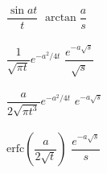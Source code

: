 \documentclass[nobib]{tufte-handout}
\begin{document}
\begin{center}
\begin{table}
\begin{tabbing}
            $\dfrac{\sin at}{t}$	\> $\arctan \dfrac{a}{s}$ \>\LTNUM \\ \\
            $\dfrac{1}{\sqrt{\pi t}}e^{-a^2/4t}$	\> $\dfrac{e^{-a\sqrt{s}}}{\sqrt{s}}$ \> \LTNUM \\ \\
            $\dfrac{a}{2\sqrt{\pi t^3}}e^{-a^2/4t}$	\> $e^{-a\sqrt{s}}$ \> \LTNUM \\ \\
            $\text{erfc}\left(\dfrac{a}{2\sqrt{t}}\right)$ \>  $\dfrac{e^{-a\sqrt{s}}}{s}$ \> \LTNUM \\ \\
        \end{tabbing}
    \end{table}
\end{center}
\end{document}
